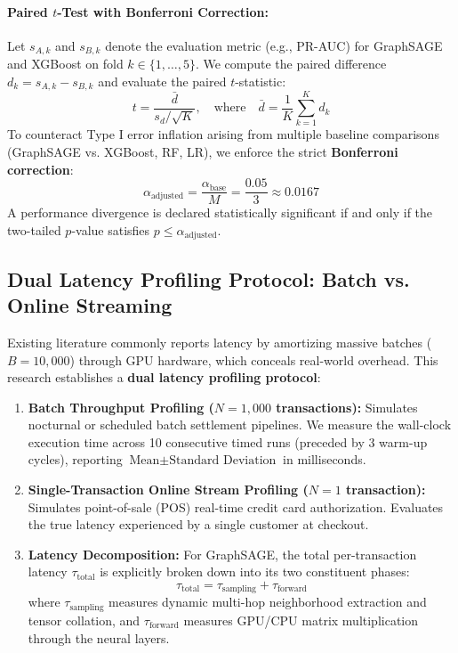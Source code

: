 \documentclass[11pt,a4paper]{article}
\begin{document}
\paragraph{Paired $t$-Test with Bonferroni Correction:}
Let $s_{A, k}$ and $s_{B, k}$ denote the evaluation metric (e.g., PR-AUC) for GraphSAGE and XGBoost on fold $k \in \{1, \dots, 5\}$. We compute the paired difference $d_k = s_{A, k} - s_{B, k}$ and evaluate the paired $t$-statistic:
\begin{equation}
t = \frac{\bar{d}}{s_d / \sqrt{K}}, \quad \text{where} \quad \bar{d} = \frac{1}{K} \sum_{k=1}^K d_k
\end{equation}
To counteract Type I error inflation arising from multiple baseline comparisons (GraphSAGE vs. XGBoost, RF, LR), we enforce the strict \textbf{Bonferroni correction}:
\begin{equation}
\alpha_{\text{adjusted}} = \frac{\alpha_{\text{base}}}{M} = \frac{0.05}{3} \approx 0.0167
\end{equation}
A performance divergence is declared statistically significant if and only if the two-tailed $p$-value satisfies $p \le \alpha_{\text{adjusted}}$.

\subsection{Dual Latency Profiling Protocol: Batch vs. Online Streaming}
Existing literature commonly reports latency by amortizing massive batches ($B=10,000$) through GPU hardware, which conceals real-world overhead. This research establishes a \textbf{dual latency profiling protocol}:
\begin{enumerate}[leftmargin=*]
    \item \textbf{Batch Throughput Profiling ($N=1,000$ transactions):} Simulates nocturnal or scheduled batch settlement pipelines. We measure the wall-clock execution time across 10 consecutive timed runs (preceded by 3 warm-up cycles), reporting $\text{Mean} \pm \text{Standard Deviation}$ in milliseconds.
    \item \textbf{Single-Transaction Online Stream Profiling ($N=1$ transaction):} Simulates point-of-sale (POS) real-time credit card authorization. Evaluates the true latency experienced by a single customer at checkout.
    \item \textbf{Latency Decomposition:} For GraphSAGE, the total per-transaction latency $\tau_{\text{total}}$ is explicitly broken down into its two constituent phases:
    \begin{equation}
    \tau_{\text{total}} = \tau_{\text{sampling}} + \tau_{\text{forward}}
    \end{equation}
    where $\tau_{\text{sampling}}$ measures dynamic multi-hop neighborhood extraction and tensor collation, and $\tau_{\text{forward}}$ measures GPU/CPU matrix multiplication through the neural layers.
\end{enumerate}
\end{document}
